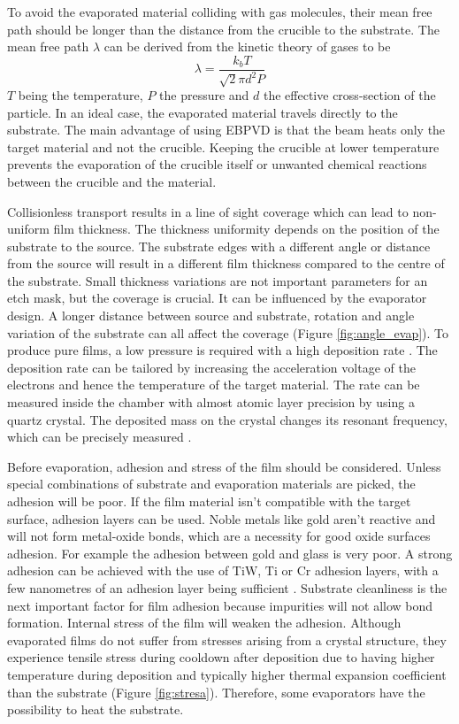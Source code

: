 \documentclass[final]{jyflluk}
\begin{document}
To avoid the evaporated material colliding with gas molecules, their mean free path should be longer than the distance from the crucible to the substrate. The mean free path $\lambda$ can be derived from the kinetic theory of gases to be 
%
\begin{equation}
    \label{eq:mean_free}
    \lambda = \frac{k_b T}{\sqrt{2}\pi d^2 P}
 \end{equation}
$T$ being the temperature, $P$ the pressure and $d$ the effective cross-section of the particle. In an ideal case, the evaporated material travels directly to the substrate. The main advantage of using EBPVD is that the beam heats only the target material and not the crucible. Keeping the crucible at lower temperature prevents the evaporation of the crucible itself or unwanted chemical reactions between the crucible and the material. \cite{franssila2010introduction}

Collisionless transport results in a line of sight coverage which can lead to non-uniform film thickness. The thickness uniformity depends on the position of the substrate to the source. The substrate edges with a different angle or distance from the source will result in a different film thickness compared to the centre of the substrate. Small thickness variations are not important parameters for an etch mask, but the coverage is crucial. It can be influenced by the evaporator design. A longer distance between source and substrate, rotation and angle variation of the substrate can all affect the coverage (Figure \ref{fig:angle_evap}).
To produce pure films, a low pressure is required with a high deposition rate \cite{ohring1992materials}. The deposition rate can be tailored by increasing the acceleration voltage of the electrons and hence the temperature of the target material. The rate can be measured inside the chamber with almost atomic layer precision by using a quartz crystal. The deposited mass on the crystal changes its resonant frequency, which can be precisely measured \cite{franssila2010introduction}. 

Before evaporation, adhesion and stress of the film should be considered. Unless special combinations of substrate and evaporation materials are picked, the adhesion will be poor. If the film material isn’t compatible with the target surface, adhesion layers can be used. Noble metals like gold aren’t reactive and will not form metal-oxide bonds, which are a necessity for good oxide surfaces adhesion. For example the adhesion between gold and glass is very poor. A strong adhesion can be achieved with the use of $\mathrm{TiW}$, $\mathrm{Ti}$ or $\mathrm{Cr}$ adhesion layers, with a few nanometres of an adhesion layer being sufficient \cite{chen2013study}. Substrate cleanliness is the next important factor for film adhesion because impurities will not allow bond formation. Internal stress of the film will weaken the adhesion. Although evaporated films do not suffer from stresses arising from a crystal structure, they experience tensile stress during cooldown after deposition due to having higher temperature during deposition and typically higher thermal expansion coefficient than the substrate (Figure \ref{fig:stresa}).  Therefore, some evaporators have the possibility to heat the substrate. \cite{franssila2010introduction}
\end{document}
